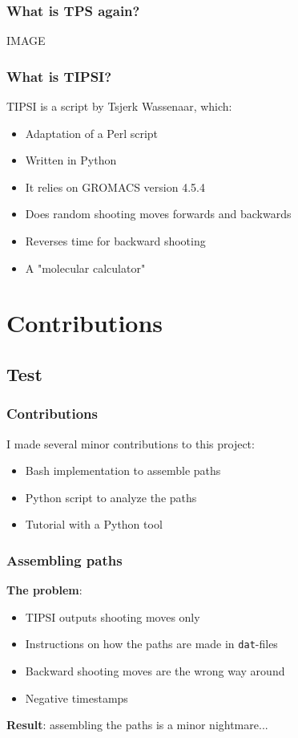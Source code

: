 \documentclass[hyperref={pdfpagelabels=false}]{beamer}
\begin{document}
\begin{frame}
\frametitle{What is TPS again?} 
IMAGE
\end{frame}

\begin{frame}
\frametitle{What is \textsc{TIPSI}?} 
\textsc{TIPSI} is a script by Tsjerk Wassenaar, which:
\begin{itemize}
\item Adaptation of a Perl script
\item Written in Python
\item It relies on \textsc{GROMACS} version 4.5.4
\item Does random shooting moves forwards and backwards
\item Reverses time for backward shooting
\item A "molecular calculator"
\end{itemize}
\end{frame}

\section{Contributions}
\subsection{Test}

\begin{frame}
\frametitle{Contributions}
I made several minor contributions to this project:
\begin{itemize}
\item Bash implementation to assemble paths
\item Python script to analyze the paths
\item Tutorial with a Python tool
\end{itemize}
\end{frame}

\begin{frame}
\frametitle{Assembling paths}
\textbf{The problem}: 
\begin{itemize}
\item \textsc{TIPSI} outputs shooting moves only
\item Instructions on how the paths are made in \texttt{dat}-files
\item Backward shooting moves are the wrong way around
\item Negative timestamps
\end{itemize}
\textbf{Result}: assembling the paths is a minor nightmare...
\end{frame}
\end{document}
